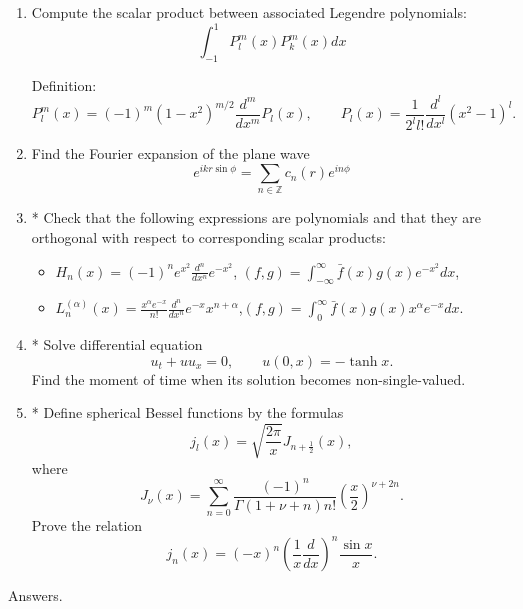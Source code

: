 \documentclass[a4paper,11pt]{article}
\begin{document}
\begin{enumerate}
\item\label{item:26} Compute the scalar product between associated Legendre polynomials:
\[
\int_{-1}^1 P_l^m(x)P_k^m(x) dx
\]

Definition:
\[
P_l^m(x)=(-1)^m(1-x^2)^{m/2}\frac{d^m}{dx^m}P_l(x),\qquad P_l(x)=\frac{1}{2^ll!}\frac{d^l}{dx^l}(x^2-1)^l.
\]

\item\label{item:27} Find the Fourier expansion of the plane wave
\[
e^{i k r\sin\phi} = \sum_{n\in \mathbb{Z}} c_n(r)e^{in\phi}
\]


\item\label{item:28} * Check that the following expressions are polynomials and that they are orthogonal with respect to corresponding scalar products:

\begin{itemize}
\item \(H_n(x)=(-1)^n e^{x^2}\frac{d^n}{dx^n}e^{-x^2}\), \qquad \((f,g)=\int_{-\infty}^{\infty} \bar{f}(x) g(x)e^{-x^2}dx\),

\item \(L_n^{(\alpha)}(x)=\frac{x^{\alpha}e^{-x}}{n!}\frac{d^n}{dx^n}e^{-x}x^{n+\alpha}\),\qquad \((f,g)=\int_0^{\infty}\bar{f}(x)g(x) x^{\alpha}e^{-x}dx\).
\end{itemize}

\item\label{item:29} * Solve differential equation
\[u_t+uu_x=0,\qquad u(0,x)=-\tanh x.\]
Find the moment of time when its solution becomes non-single-valued.

\item\label{item:30} * Define spherical Bessel functions by the formulas
\[
j_l(x)=\sqrt{\frac{2\pi}{x}}J_{n+\frac12}(x),
\]
where
\[
J_{\nu}(x)=\sum_{n=0}^{\infty}\frac{(-1)^n}{\Gamma(1+\nu+n)n!}\left( \frac{x}{2} \right)^{\nu+2n}.
\]
Prove the relation
\[
j_n(x)=(-x)^n \left(\frac{1}{x} \frac{d}{dx} \right)^n \frac{\sin x}{x}.
\]

\end{enumerate}

\newpage

Answers.
\end{document}
